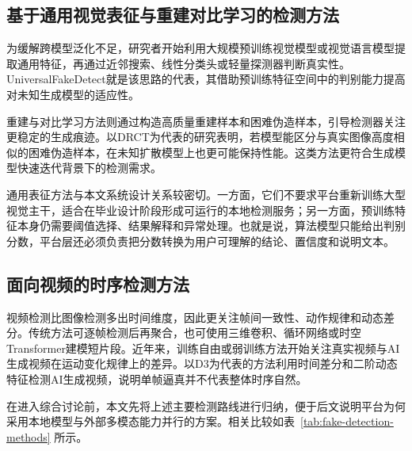 \subsection{基于通用视觉表征与重建对比学习的检测方法}

为缓解跨模型泛化不足，研究者开始利用大规模预训练视觉模型或视觉语言模型提取通用特征，再通过近邻搜索、线性分类头或轻量探测器判断真实性\cite{ref8}。UniversalFakeDetect就是该思路的代表，其借助预训练特征空间中的判别能力提高对未知生成模型的适应性\cite{ref10}。

重建与对比学习方法则通过构造高质量重建样本和困难伪造样本，引导检测器关注更稳定的生成痕迹。以DRCT为代表的研究表明，若模型能区分与真实图像高度相似的困难伪造样本，在未知扩散模型上也更可能保持性能\cite{ref12}。这类方法更符合生成模型快速迭代背景下的检测需求。

通用表征方法与本文系统设计关系较密切。一方面，它们不要求平台重新训练大型视觉主干，适合在毕业设计阶段形成可运行的本地检测服务；另一方面，预训练特征本身仍需要阈值选择、结果解释和异常处理。也就是说，算法模型只能给出判别分数，平台层还必须负责把分数转换为用户可理解的结论、置信度和说明文本。

\subsection{面向视频的时序检测方法}

视频检测比图像检测多出时间维度，因此更关注帧间一致性、动作规律和动态差分。传统方法可逐帧检测后再聚合，也可使用三维卷积、循环网络或时空Transformer建模短片段。近年来，训练自由或弱训练方法开始关注真实视频与AI生成视频在运动变化规律上的差异。以D3为代表的方法利用时间差分和二阶动态特征检测AI生成视频\cite{ref16}，说明单帧逼真并不代表整体时序自然。

在进入综合讨论前，本文先将上述主要检测路线进行归纳，便于后文说明平台为何采用本地模型与外部多模态能力并行的方案。相关比较如表~\ref{tab:fake-detection-methods} 所示。

